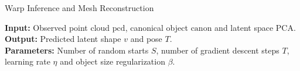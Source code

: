 \begin{algorithm}[H]


\caption{Warp Inference and Mesh Reconstruction}\label{alg:warp_infer} 

\begin{flushleft}
    \hspace*{\algorithmicindent} \textbf{Input:} Observed point cloud $\mathrm{pcd}$, canonical object $\mathrm{canon}$ and latent space $\mathrm{PCA}$. \\
    \hspace*{\algorithmicindent} \textbf{Output:} Predicted latent shape $v$ and pose $T$. \\
    \hspace*{\algorithmicindent} \textbf{Parameters:} Number of random starts $S$, number of gradient descent steps $T$, learning rate $\eta$ and object size regularization $\beta$.
\end{flushleft}

\begin{algorithmic}[1]


\end{algorithmic}
\end{algorithm}
